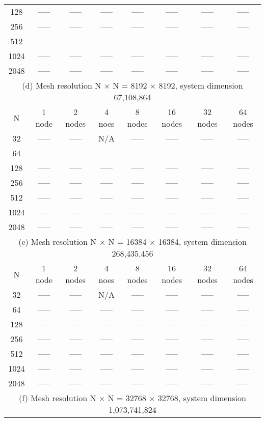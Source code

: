 \documentclass[11pt]{article}
\begin{document}
\begin{table}[!htbp]
{\begin{tabular}{ |c|c|c|c|c|c|c|c|  }
128  & ----- & ----- & ----- & ----- & ----- & ----- & ----- \\
256  & ----- & ----- & ----- & ----- & ----- & ----- & ----- \\
512  & ----- & ----- & ----- & ----- & ----- & ----- & ----- \\
1024 & ----- & ----- & ----- & ----- & ----- & ----- & ----- \\
2048 & ----- & ----- & ----- & ----- & ----- & ----- & ----- \\
\hline
\hline
\multicolumn{8}{|c|}{(d) Mesh resolution N $\times$ N = 8192 $\times$ 8192, system dimension 67,108,864}\\
\hline
N & 1 node & 2 nodes & 4 noes & 8 nodes & 16 nodes & 32 nodes & 64 nodes \\
\hline
32   & ----- & ----- & N/A   & ----- & ----- & ----- & ----- \\
64   & ----- & ----- & ----- & ----- & ----- & ----- & ----- \\
128  & ----- & ----- & ----- & ----- & ----- & ----- & ----- \\
256  & ----- & ----- & ----- & ----- & ----- & ----- & ----- \\
512  & ----- & ----- & ----- & ----- & ----- & ----- & ----- \\
1024 & ----- & ----- & ----- & ----- & ----- & ----- & ----- \\
2048 & ----- & ----- & ----- & ----- & ----- & ----- & ----- \\
\hline
\hline
\multicolumn{8}{|c|}{(e) Mesh resolution N $\times$ N = 16384 $\times$ 16384, system dimension 268,435,456}\\
\hline
N & 1 node & 2 nodes & 4 noes & 8 nodes & 16 nodes & 32 nodes & 64 nodes \\
\hline
32   & ----- & ----- & N/A   & ----- & ----- & ----- & ----- \\
64   & ----- & ----- & ----- & ----- & ----- & ----- & ----- \\
128  & ----- & ----- & ----- & ----- & ----- & ----- & ----- \\
256  & ----- & ----- & ----- & ----- & ----- & ----- & ----- \\
512  & ----- & ----- & ----- & ----- & ----- & ----- & ----- \\
1024 & ----- & ----- & ----- & ----- & ----- & ----- & ----- \\
2048 & ----- & ----- & ----- & ----- & ----- & ----- & ----- \\
\hline
\hline
\multicolumn{8}{|c|}{(f) Mesh resolution N $\times$ N = 32768 $\times$ 32768, system dimension 1,073,741,824}\\

\end{tabular}}
\end{table}
\end{document}
